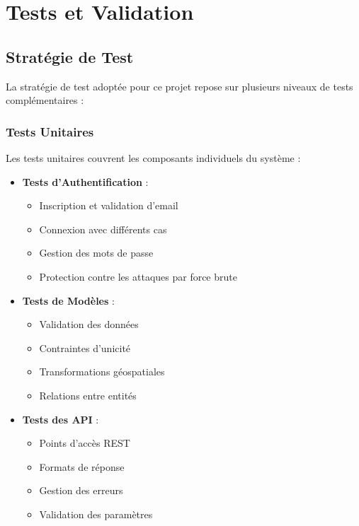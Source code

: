 \chapter{Tests et Validation}
\label{chap:TestsValidation}

\section{Stratégie de Test}
La stratégie de test adoptée pour ce projet repose sur plusieurs niveaux de tests complémentaires :

\subsection{Tests Unitaires}
Les tests unitaires couvrent les composants individuels du système :

\begin{itemize}
    \item \textbf{Tests d'Authentification} :
    \begin{itemize}
        \item Inscription et validation d'email
        \item Connexion avec différents cas
        \item Gestion des mots de passe
        \item Protection contre les attaques par force brute
    \end{itemize}
    
    \item \textbf{Tests de Modèles} :
    \begin{itemize}
        \item Validation des données
        \item Contraintes d'unicité
        \item Transformations géospatiales
        \item Relations entre entités
    \end{itemize}
    
    \item \textbf{Tests des API} :
    \begin{itemize}
        \item Points d'accès REST
        \item Formats de réponse
        \item Gestion des erreurs
        \item Validation des paramètres
    \end{itemize}
\end{itemize}

